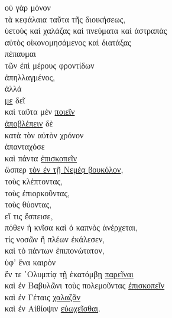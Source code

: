 \begin{greek}

{\large
\noindent οὐ γὰρ μόνον \\
\tabto{2em} τὰ κεφάλαια ταῦτα τῆς διοικήσεως, \\
\tabto{4em} ὑετοὺς καὶ χαλάζας καὶ πνεύματα καὶ ἀστραπὰς \\
\tabto{2em} αὐτὸς οἰκονομησάμενος καὶ διατάξας \\
\tabto{2em} πέπαυμαι \\
\tabto{6em} τῶν ἐπὶ μέρους φροντίδων \\
\tabto{4em} ἀπηλλαγμένος, \\
ἀλλά \\
\tabto{2em} \underline{με} δεῖ \\
\tabto{4em} καὶ ταῦτα μὲν \underline{ποιεῖν} \\
\tabto{4em} \underline{ἀποβλέπειν} δὲ \\
\tabto{6em} κατὰ τὸν αὐτὸν χρόνον \\
\tabto{4em} ἁπανταχόσε \\
\tabto{4em} καὶ πάντα \underline{ἐπισκοπεῖν} \\
\tabto{6em} ὥσπερ \underline{τὸν ἐν τῇ Νεμέᾳ βουκόλον}, \\
\tabto{8em} τοὺς κλέπτοντας, \\
\tabto{8em} τοὺς ἐπιορκοῦντας, \\
\tabto{8em} τοὺς θύοντας, \\
\tabto{8em} εἴ τις ἔσπεισε, \\
\tabto{8em} πόθεν ἡ κνῖσα καὶ ὁ καπνὸς ἀνέρχεται, \\
\tabto{8em} τίς νοσῶν ἢ πλέων ἐκάλεσεν, \\
\tabto{8em} καὶ τὸ πάντων ἐπιπονώτατον, \\
\tabto{10em} ὑφ' ἕνα καιρὸν \\
\tabto{8em} ἔν τε ᾿Ολυμπίᾳ τῇ ἑκατόμβῃ \underline{παρεῖναι} \\
\tabto{8em} καὶ ἐν Βαβυλῶνι τοὺς πολεμοῦντας \underline{ἐπισκοπεῖν} \\
\tabto{8em} καὶ ἐν Γέταις \underline{χαλαζᾶν} \\
\tabto{8em} καὶ ἐν Αἰθίοψιν \underline{εὐωχεῖσθαι}.

}
\end{greek}



